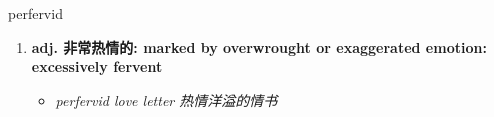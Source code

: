 
\begin{frame}
{\huge perfervid}
\begin{center}
\begin{enumerate}\Large
  \item \textbf{adj. 非常热情的: marked by overwrought or exaggerated emotion: excessively fervent}
  \begin{itemize}
    \item \em{\Large{perfervid love letter 热情洋溢的情书}}
  \end{itemize}
\end{enumerate}
\end{center}
\end{frame}
